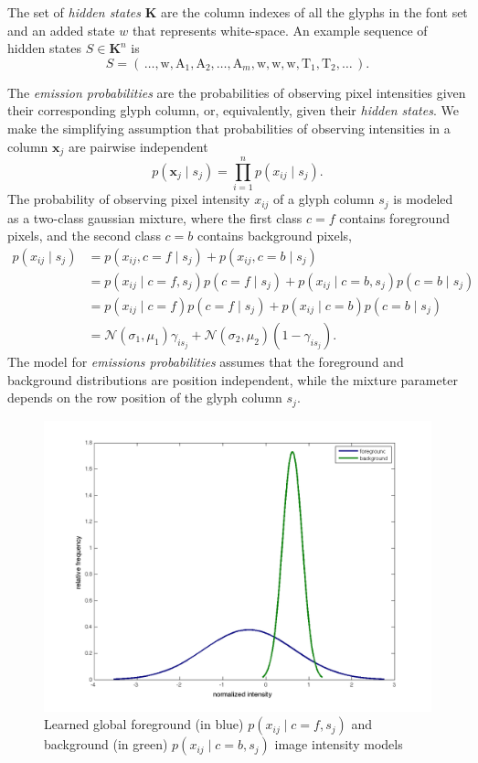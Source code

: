 \documentclass[a4paper,12pt]{article}
\begin{document}
The set of \emph{hidden states} $\mathbf{K}$ are the column indexes of
all the glyphs in the font set and an added state $w$ that represents
white-space. An example sequence of hidden states $S \in \mathbf{K}^n$
is
\[S =
\left(\,\dots,\text{w},\text{A}_1,\text{A}_2,\ldots,\text{A}_{m},\text{w},\text{w},\text{w},\text{T}_1,\text{T}_2,\ldots\,\right).\]

The \emph{emission probabilities} are the probabilities of observing
pixel intensities given their corresponding glyph column, or,
equivalently, given their \emph{hidden states}. We make the
simplifying assumption that probabilities of observing intensities in
a column $\mathbf{x}_j$ are pairwise independent \[p(\mathbf{x}_j \mid
s_j) = \prod_{i=1}^np(x_{ij} \mid s_j).\] The probability of observing
pixel intensity $x_{ij}$ of a glyph column $s_j$ is modeled as a
two-class gaussian mixture, where the first class $c=f$ contains
foreground pixels, and the second class $c=b$ contains background
pixels,
\begin{align*}
  p(x_{ij} \mid s_j) &= p(x_{ij},c=f \mid s_j)+p(x_{ij},c=b \mid s_j)\\
  &= p(x_{ij}\mid c=f,s_j)p(c=f \mid s_j)+p(x_{ij} \mid c=b,s_j)p(c=b \mid s_j) \\
  &= p(x_{ij}\mid c=f)p(c=f \mid s_j)+p(x_{ij} \mid c=b)p(c=b \mid s_j) \\
  &= \mathcal{N}(\sigma_1,\mu_1)\gamma_{is_j}+\mathcal{N}(\sigma_2,\mu_2)(1-\gamma_{is_j}).
\end{align*}
The model for \emph{emissions probabilities} assumes that the
foreground and background distributions are position independent,
while the mixture parameter depends on the row position of the glyph
column $s_j$.

\begin{figure}[htp]
\centering
\includegraphics[width=\linewidth]{pics/distribution.png}
\caption{ Learned global foreground (in blue) $ p(x_{ij}\mid c=f,s_j)$ and
  background (in green) $p(x_{ij} \mid c=b,s_j)$ image intensity models }
\label{fig:distribution}
\end{figure}
\end{document}
